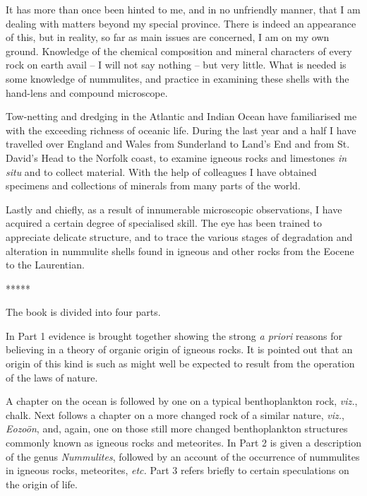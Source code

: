 \documentclass[a4paper, 12pt, oneside]{article}
\begin{document}
\begin{enumerate}
\hspace*{5mm}It has more than once been hinted to me, and in no unfriendly manner, that I am dealing with matters beyond my special province. There is indeed an appearance of this, but in reality, so far as main issues are concerned, I am on my own ground. Knowledge of the chemical composition and mineral characters of every rock on earth avail -- I will not say nothing -- but very little. What is needed is some knowledge of nummulites, and practice in examining these shells with the hand-lens and compound microscope.

\hspace*{5mm}Tow-netting and dredging in the Atlantic and Indian Ocean have familiarised me with the exceeding richness of oceanic life. During the last year and a half I have travelled over England and Wales from Sunderland to Land's End and from St. David's Head to the Norfolk coast, to examine igneous rocks and limestones \emph{in situ} and to collect material. With the help of colleagues I have obtained specimens and collections of minerals from many parts of the world.

\hspace*{5mm}Lastly and chiefly, as a result of innumerable microscopic observations, I have acquired a certain degree of specialised skill. The eye has been trained to appreciate delicate structure, and to trace the various stages of degradation and alteration in nummulite shells found in igneous and other rocks from the Eocene to the Laurentian.
\end{enumerate}

\centerline{*\hspace{15mm}*\hspace{15mm}*\hspace{15mm}*\hspace{15mm}*}
\bigskip

The book is divided into four parts.

In Part 1 evidence is brought together showing the strong \emph{a priori} reasons for believing in a theory of organic origin of igneous rocks. It is pointed out that an origin of this kind is such as might well be expected to result from the operation of the laws of nature.

A chapter on the ocean is followed by one on a typical benthoplankton rock, \emph{viz.}, chalk. Next follows a chapter on a more changed rock of a similar nature, \emph{viz.}, \emph{Eozoön}, and, again, one on those still more changed benthoplankton structures commonly known as igneous rocks and meteorites. In Part 2 is given a description of the genus \emph{Nummulites}, followed by an account of the occurrence of nummulites in igneous rocks, meteorites, \emph{etc.} Part 3 refers briefly to certain speculations on the origin of life.
\end{document}
